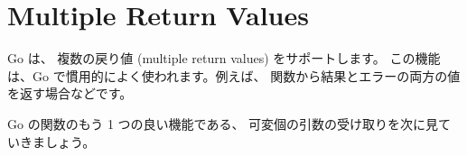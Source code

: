 \section{Multiple Return Values}

Go は、 複数の戻り値 (multiple return values) をサポートします。 この機能は、Go で慣用的によく使われます。例えば、 関数から結果とエラーの両方の値を返す場合などです。




Go の関数のもう 1 つの良い機能である、 可変個の引数の受け取りを次に見ていきましょう。